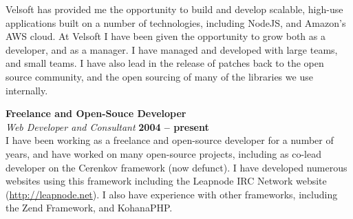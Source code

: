 \documentclass[margin,line]{resume}
\begin{document}
\begin{resume}
	

	Velsoft has provided me the opportunity to build and develop scalable, high-use applications built on a number of technologies, including NodeJS, and Amazon's AWS cloud. At Velsoft I have been given the opportunity to grow both as a developer, and as a manager. I have managed and developed with large teams, and small teams. I have also lead in the release of patches back to the open source community, and the open sourcing of many of the libraries we use internally.

	{\bf Freelance and Open-Souce Developer} \vspace{2mm}\\\vspace{1mm}%
	{\sl Web Developer and Consultant} \hfill {\bf 2004 -- present}\\
	I have been working as a freelance and open-source developer for a number of years, and have worked on many open-source projects, including as co-lead developer on the Cerenkov framework (now defunct). I have developed numerous websites using this framework including the Leapnode IRC Network website (\href{http://leapnode.net}{http://leapnode.net}). I also have experience with other frameworks, including the Zend Framework, and KohanaPHP. 


\end{resume}
\end{document}
